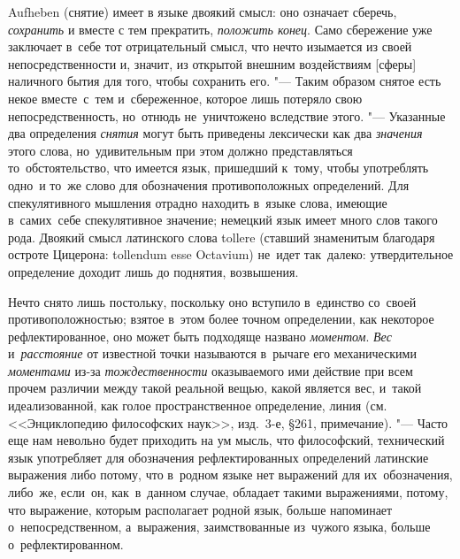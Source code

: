 Aufheben (снятие) имеет в языке двоякий смысл: оно означает сберечь,
{\em сохранить} и вместе с тем прекратить,
{\em положить конец}. Само сбережение уже заключает в~себе
тот отрицательный смысл, что нечто изымается из своей
непосредственности и, значит, из открытой внешним воздействиям [сферы]
наличного бытия для того, чтобы сохранить его. "--- Таким образом снятое
есть некое вместе~с~тем и~сбереженное, которое лишь потеряло свою
непосредственность, но~отнюдь не~уничтожено вследствие этого.
"--- Указанные два определения {\em снятия} могут быть приведены
лексически как два {\em значения} этого слова, но~удивительным
при этом должно представляться то~обстоятельство, что имеется
язык, пришедший к~тому, чтобы употреблять одно~и то~же слово для
обозначения противоположных определений. Для спекулятивного мышления
отрадно находить в~языке слова, имеющие в~самих~себе спекулятивное
значение; немецкий язык имеет много слов такого рода. Двоякий смысл
латинского слова tollere (ставший знаменитым благодаря остроте Цицерона:
tollendum esse Octavium)
не~идет так~далеко: утвердительное определение доходит лишь до поднятия,
возвышения.

Нечто снято лишь постольку, поскольку оно вступило в~единство со~своей
противоположностью; взятое в~этом более точном определении, как некоторое
рефлектированное, оно может быть подходяще названо
{\em моментом}. {\em Вес} и~{\em расстояние} от известной точки называются
в~рычаге его механическими {\em моментами} из-за
{\em тождественности} оказываемого ими действие при
всем прочем различии между такой реальной вещью, какой является вес,
и~такой идеализованной, как голое пространственное определение, линия
(см. <<Энциклопедию философских наук>>, изд.~3-е, \S 261, примечание).
"--- Часто еще нам невольно будет приходить на ум мысль, что философский,
технический язык употребляет для обозначения рефлектированных
определений латинские выражения
либо потому, что в~родном языке нет выражений для их~обозначения, либо~же,
если~он, как~в~данном случае, обладает такими выражениями, потому, что
выражение, которым располагает родной язык, больше напоминает
о~непосредственном, а~выражения, заимствованные из~чужого языка,
больше о~рефлектированном.

